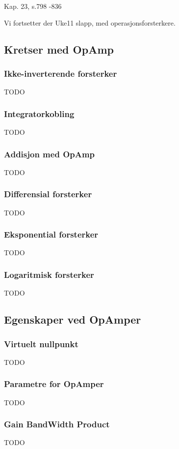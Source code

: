 Kap. 23, s.798 -836

Vi fortsetter der Uke11 slapp, med operasjonsforsterkere.

\subsection{Kretser med OpAmp}
  \subsubsection{Ikke-inverterende forsterker}
    TODO
  \subsubsection{Integratorkobling}
    TODO
  \subsubsection{Addisjon med OpAmp}
    TODO
  \subsubsection{Differensial forsterker}
    TODO
  \subsubsection{Eksponential forsterker}
    TODO
  \subsubsection{Logaritmisk forsterker}
    TODO
\subsection{Egenskaper ved OpAmper}
  \subsubsection{Virtuelt nullpunkt}
    TODO
  \subsubsection{Parametre for OpAmper}
    TODO
  \subsubsection{Gain BandWidth Product}
    TODO
